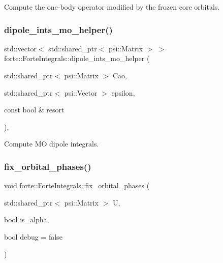 Compute the one-\/body operator modified by the frozen core orbitals. 

\mbox{\label{classforte_1_1_forte_integrals_ad459b61022f3cc816f471e11022e1047}} 
\subsubsection{\texorpdfstring{dipole\+\_\+ints\+\_\+mo\+\_\+helper()}{dipole\_ints\_mo\_helper()}}
{\footnotesize\ttfamily std\+::vector$<$ std\+::shared\+\_\+ptr$<$ psi\+::\+Matrix $>$ $>$ forte\+::\+Forte\+Integrals\+::dipole\+\_\+ints\+\_\+mo\+\_\+helper (\begin{DoxyParamCaption}\item[{std\+::shared\+\_\+ptr$<$ psi\+::\+Matrix $>$}]{Cao,  }\item[{std\+::shared\+\_\+ptr$<$ psi\+::\+Vector $>$}]{epsilon,  }\item[{const bool \&}]{resort }\end{DoxyParamCaption})\hspace{0.3cm}{\ttfamily [protected]}, {\ttfamily [virtual]}}



Compute MO dipole integrals. 

\mbox{\label{classforte_1_1_forte_integrals_a4e6072183864e721498d63c65c24a114}} 
\subsubsection{\texorpdfstring{fix\+\_\+orbital\+\_\+phases()}{fix\_orbital\_phases()}}
{\footnotesize\ttfamily void forte\+::\+Forte\+Integrals\+::fix\+\_\+orbital\+\_\+phases (\begin{DoxyParamCaption}\item[{std\+::shared\+\_\+ptr$<$ psi\+::\+Matrix $>$}]{U,  }\item[{bool}]{is\+\_\+alpha,  }\item[{bool}]{debug = {\ttfamily false} }\end{DoxyParamCaption})}

